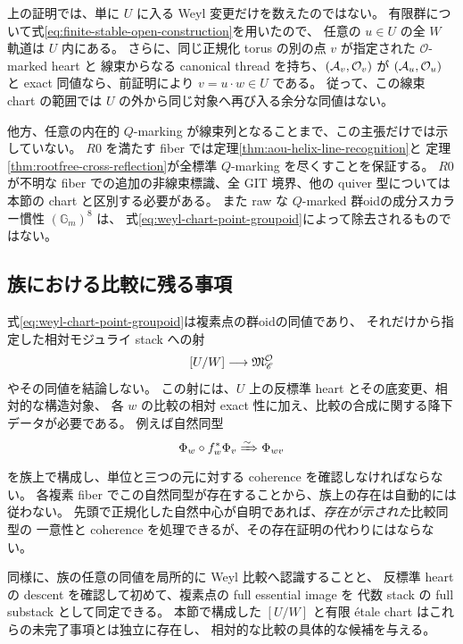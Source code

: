 \begin{remark}
\label{rem:weyl-chart-saturation}
上の証明では、単に $U$ に入る Weyl 変更だけを数えたのではない。
有限群について式\eqref{eq:finite-stable-open-construction}を用いたので、
任意の $u\in U$ の全 $W$ 軌道は $U$ 内にある。
さらに、同じ正規化 torus の別の点 $v$ が指定された $\mathcal O$-marked heart と
線束からなる canonical thread を持ち、$(\mathcal A_v,\mathcal O_v)$ が
$(\mathcal A_u,\mathcal O_u)$ と exact 同値なら、前証明により
$v=u\cdot w\in U$ である。
従って、この線束 chart の範囲では $U$ の外から同じ対象へ再び入る余分な同値はない。

他方、任意の内在的 $Q$-marking が線束列となることまで、この主張だけでは示していない。
$R0$ を満たす fiber では定理\ref{thm:aou-helix-line-recognition}と
定理\ref{thm:rootfree-cross-reflection}が全標準 $Q$-marking を尽くすことを保証する。
$R0$ が不明な fiber での追加の非線束標識、全 GIT 境界、他の quiver 型については
本節の chart と区別する必要がある。
また raw な $Q$-marked 群oidの成分スカラー慣性 $(\mathbb G_m)^8$ は、
式\eqref{eq:weyl-chart-point-groupoid}によって除去されるものではない。
\end{remark}

\subsection{族における比較に残る事項}

式\eqref{eq:weyl-chart-point-groupoid}は複素点の群oidの同値であり、
それだけから指定した相対モジュライ stack への射
\[
 [U/W]\longrightarrow\mathfrak M^{\mathcal O}_{\mathscr C}
\]
やその同値を結論しない。
この射には、$U$ 上の反標準 heart とその底変更、相対的な構造対象、
各 $w$ の比較の相対 exact 性に加え、比較の合成に関する降下データが必要である。
例えば自然同型
\[
 \Phi_w\circ f_w^*\Phi_v\xRightarrow{\sim}\Phi_{wv}
\]
を族上で構成し、単位と三つの元に対する coherence を確認しなければならない。
各複素 fiber でこの自然同型が存在することから、族上の存在は自動的には従わない。
先頭で正規化した自然中心が自明であれば、\emph{存在が示された}比較同型の
一意性と coherence を処理できるが、その存在証明の代わりにはならない。

同様に、族の任意の同値を局所的に Weyl 比較へ認識することと、
反標準 heart の descent を確認して初めて、複素点の full essential image を
代数 stack の full substack として同定できる。
本節で構成した $[U/W]$ と有限 \'etale chart はこれらの未完了事項とは独立に存在し、
相対的な比較の具体的な候補を与える。
